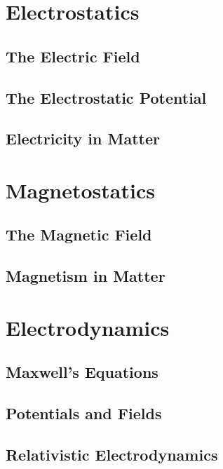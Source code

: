 \documentclass{book}
\theoremstyle{definition}
\theoremstyle{remark}
\begin{document}

\tableofcontents
\part{Electrostatics}
\chapter{The Electric Field}
%

\chapter{The Electrostatic Potential}

\chapter{Electricity in Matter}

\part{Magnetostatics}
\chapter{The Magnetic Field}

\chapter{Magnetism in Matter}

\part{Electrodynamics}
\chapter{Maxwell's Equations}

\chapter{Potentials and Fields}
\chapter{Relativistic Electrodynamics}
\end{document}
